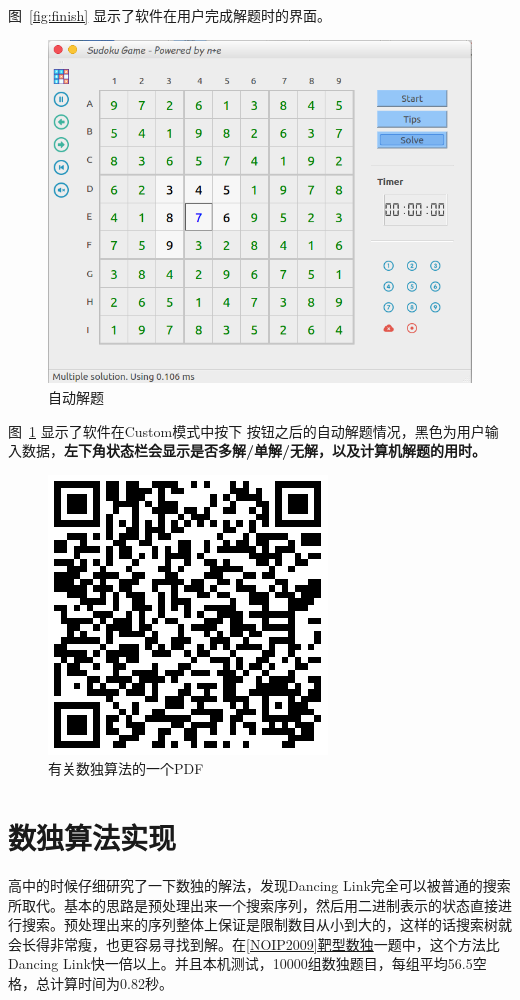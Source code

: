 \documentclass[a4paper]{article}
\begin{document}
图~\ref{fig:finish} 显示了软件在用户完成解题时的界面。

\begin{figure}[htp]
\centering
\includegraphics[width=0.7\linewidth]{solve.png}
\caption{自动解题}
\label{fig:solve}
\end{figure}

图~\ref{fig:solve} 显示了软件在Custom模式中按下  按钮之后的自动解题情况，黑色为用户输入数据，{\bf 左下角状态栏会显示是否多解/单解/无解，以及计算机解题的用时。}

\begin{figure}[htp]
\centering
\includegraphics[width=0.5\linewidth]{ewm.png}
\caption{有关数独算法的一个PDF}
\label{fig:ewm}
\end{figure}

\section{数独算法实现}

高中的时候仔细研究了一下数独的解法，发现Dancing Link完全可以被普通的搜索所取代。基本的思路是预处理出来一个搜索序列，然后用二进制表示的状态直接进行搜索。预处理出来的序列整体上保证是限制数目从小到大的，这样的话搜索树就会长得非常瘦，也更容易寻找到解。在\uline{[NOIP2009]靶型数独}一题中，这个方法比Dancing Link快一倍以上。并且本机测试，10000组数独题目，每组平均56.5空格，总计算时间为0.82秒。
\end{document}

